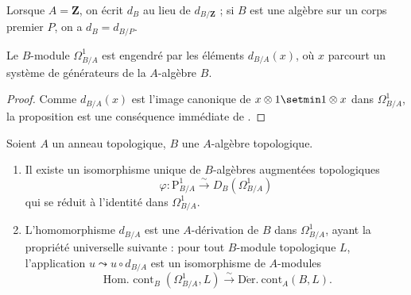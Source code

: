 Lorsque $A=\mathbf{Z}$, on écrit $d_B$ au lieu de $d_{B/\mathbf{Z}}$ ; si $B$
est une algèbre sur un corps premier $P$, on a $d_B=d_{B/P}$.

\begin{proposition}[20.4.7]
\label{0.20.4.7-fr}
Le $B$-module $\Omega^1_{B/A}$ est engendré par les éléments $d_{B/A}(x)$,
où $x$ parcourt un système de générateurs de la $A$-algèbre $B$.
\end{proposition}

\begin{proof}
Comme $d_{B/A}(x)$ est l'image canonique de $x\otimes1\setmin 1\otimes x$ dans
$\Omega^1_{B/A}$, la proposition est une conséquence immédiate de
.
\end{proof}

\begin{theorem}[20.4.8]
\label{0.20.4.8-fr}
Soient $A$ un anneau topologique, $B$ une $A$-algèbre topologique.
\begin{enumerate}
  \item[\rm(i)] Il existe un isomorphisme unique de $B$-algèbres augmentées
  topologiques
\begin{equation}
\tag{20.4.8.1}
\label{0.20.4.8.1-fr}
  \varphi:\mathrm{P}^1_{B/A}\xrightarrow{\sim}D_B(\Omega^1_{B/A})
\end{equation}
qui se réduit à l'identité dans $\Omega^1_{B/A}$.
  \item[\rm(ii)] L'homomorphisme $d_{B/A}$ est une $A$-dérivation de $B$
  dans $\Omega^1_{B/A}$, ayant la propriété universelle suivante : pour tout
  $B$-module topologique $L$, l'application $u\leadsto u\circ d_{B/A}$ est
  un isomorphisme de $A$-modules
\begin{equation}
\tag{20.4.8.2}
\label{0.20.4.8.2-fr}
  \operatorname{Hom.\ cont}_B(\Omega^1_{B/A},L)
  \xrightarrow{\sim}\operatorname{D\acute{e}r.\ cont}_A(B,L).
\end{equation}
\end{enumerate}
\end{theorem}

